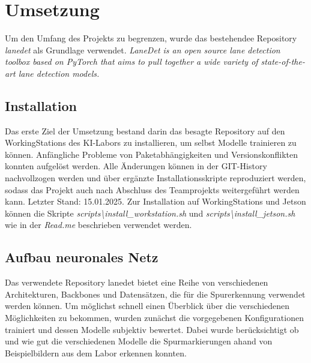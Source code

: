 \documentclass{article}
\begin{document}
    \section{Umsetzung}
        Um den Umfang des Projekts zu begrenzen, wurde das bestehendee Repository \textit{lanedet} als Grundlage verwendet.
        \textit{LaneDet is an open source lane detection toolbox based on PyTorch that aims to pull together a wide variety of state-of-the-art lane detection models.}

        \subsection{Installation}
            Das erste Ziel der Umsetzung bestand darin das besagte Repository auf den WorkingStations des KI-Labors zu installieren, um selbst Modelle trainieren zu können.
            Anfängliche Probleme von Paketabhängigkeiten und Versionskonflikten konnten aufgelöst werden. 
            Alle Änderungen können in der GIT-History nachvollzogen werden und über ergänzte Installationsskripte reproduziert werden, sodass das Projekt auch nach Abschluss des Teamprojekts weitergeführt werden kann. Letzter Stand: 15.01.2025. %
            Zur Installation auf WorkingStations und Jetson können die Skripte \textit{scripts\textbackslash install\_workstation.sh} und \textit{scripts\textbackslash install\_jetson.sh} wie in der \textit{Read.me} beschrieben verwendet werden.

        \subsection{Aufbau neuronales Netz}
            Das verwendete Repository lanedet bietet eine Reihe von verschiedenen Architekturen, Backbones und Datensätzen, die für die Spurerkennung verwendet werden können.
            Um möglichst schnell einen Überblick über die verschiedenen Möglichkeiten zu bekommen, wurden zunächst die vorgegebenen Konfigurationen trainiert und dessen Modelle subjektiv bewertet.
            Dabei wurde berücksichtigt ob und wie gut die verschiedenen Modelle die Spurmarkierungen ahand von Beispielbildern aus dem Labor erkennen konnten.
\end{document}
